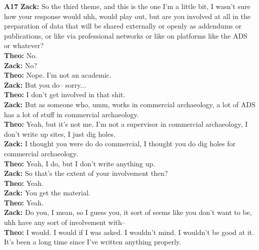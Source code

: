 \documentclass{article}
\begin{document}
\noindent\textbf{A17}\label{sec-A17}\newline
\textbf{Zack:} So the third theme, and this is the one I'm a little bit,
I wasn't sure how your response would uhh, would play out, but are you
involved at all in the preparation of data that will be shared
externally or openly as addendums or publications, or like via
professional networks or like on platforms like the ADS or whatever?\\
\textbf{Theo:} No.\\
\textbf{Zack:} No?\\
\textbf{Theo:} Nope. I'm not an academic.\\
\textbf{Zack:} But you do-- sorry...\\
\textbf{Theo:} I don't get involved in that shit.\\
\textbf{Zack:} But as someone who, umm, works in commercial archaeology,
a lot of ADS has a lot of stuff in commercial archaeology.\\
\textbf{Theo:} Yeah, but it's not me. I'm not a supervisor in commercial
archaeology, I don't write up sites, I just dig holes.\\
\textbf{Zack:} I thought you were do do commercial, I thought you do dig
holes for commercial archaeology.\\
\textbf{Theo:} Yeah, I do, but I don't write anything up.\\
\textbf{Zack:} So that's the extent of your involvement then?\\
\textbf{Theo:} Yeah.\\
\textbf{Zack:} You get the material.\\
\textbf{Theo:} Yeah.\\
\textbf{Zack:} Do you, I mean, so I guess you, it sort of seems like you
don't want to be, uhh have any sort of involvement with--\\
\textbf{Theo:} I would. I would if I was asked. I wouldn't mind. I
wouldn't be good at it. It's been a long time since I've written
anything properly.\newline
\end{document}
